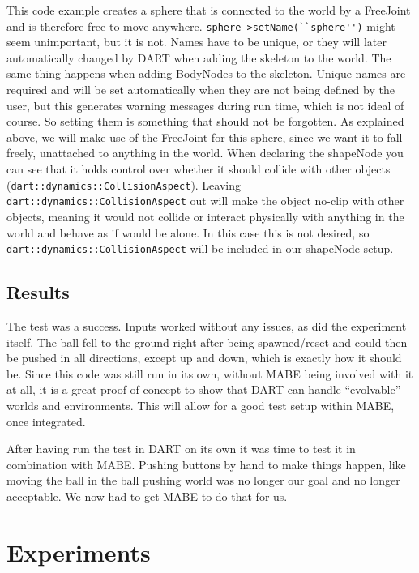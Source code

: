 \documentclass[12pt,oneside,listof=totoc,paper=a4,headings=small]{scrbook}
\begin{document}
This code example creates a sphere that is connected to the world by a FreeJoint and is therefore free to move anywhere.
\lstinline{sphere->setName(``sphere'')} might seem unimportant, but it is not. Names have to be unique, or they will later automatically changed by DART when adding the skeleton to the world. The same thing happens when adding BodyNodes to the skeleton. Unique names are required and will be set automatically when they are not being defined by the user, but this generates warning messages during run time, which is not ideal of course. So setting them is something that should not be forgotten.
As explained above, we will make use of the FreeJoint for this sphere, since we want it to fall freely, unattached to anything in the world.
When declaring the shapeNode you can see that it holds control over whether it should collide with other objects (\lstinline{dart::dynamics::CollisionAspect}). Leaving \lstinline{dart::dynamics::CollisionAspect} out will make the object no-clip with other objects, meaning it would not collide or interact physically with anything in the world and behave as if would be alone. In this case this is not desired, so \lstinline{dart::dynamics::CollisionAspect} will be included in our shapeNode setup.


\subsection{Results}
The test was a success. Inputs worked without any issues, as did the experiment itself. The ball fell to the ground right after being spawned/reset and could then be pushed in all directions, except up and down, which is exactly how it should be. Since this code was still run in its own, without MABE being involved with it at all, it is a great proof of concept to show that DART can handle ``evolvable'' worlds and environments.  This will allow for a good test setup within MABE, once integrated.  

After having run the test in DART on its own it was time to test it in combination with MABE. Pushing buttons by hand to make things happen, like moving the ball in the ball pushing world was no longer our goal and no longer acceptable. We now had to get MABE to do that for us.


\newpage

\section{Experiments}
\end{document}
